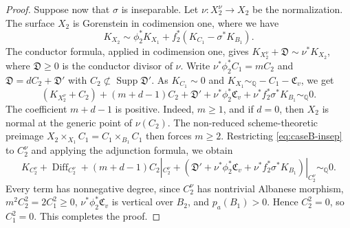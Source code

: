 \documentclass[10pt,abstract=true]{scrartcl}
\numberwithin{equation}{section}
\theoremstyle{definition}
\theoremstyle{remark}
\def\simQ{\sim_{\mathbb Q}} \def\geQ{\ge_{\mathbb Q}}
\DeclareMathOperator\Supp{Supp}
\begin{document}
\begin{proof}
  Suppose now that $\sigma$ is inseparable.
  Let $\nu\colon X_2^\nu\to X_2$ be the normalization.
  The surface $X_2$ is Gorenstein in codimension one, where we have
  \[
    K_{X_2}\sim\phi_2^*K_{X_1}+f_2^*(K_{C_1}-\sigma^*K_{B_1}).
  \]
  The conductor formula, applied in codimension one, gives $K_{X_2^\nu}+\mathfrak D\sim\nu^*K_{X_2}$, where $\mathfrak D\geq0$ is the conductor divisor of $\nu$.
  Write $\nu^*\phi_2^*C_1=mC_2$ and $\mathfrak D=dC_2+\mathfrak D'$ with $C_2\not\subset\Supp\mathfrak D'$.
  As $K_{C_1}\sim0$ and $K_{X_1}\simQ-C_1-\mathfrak C_v$, we get
  \begin{equation}\label{eq:caseB-insep}
    (K_{X_2^\nu}+C_2)+(m+d-1)C_2+\mathfrak D'+\nu^*\phi_2^*\mathfrak C_v+\nu^*f_2^*\sigma^*K_{B_1}\simQ0.
  \end{equation}
  The coefficient $m+d-1$ is positive.
  Indeed, $m\ge1$, and if $d=0$, then $X_2$ is normal at the generic point of $\nu(C_2)$.
  The non-reduced scheme-theoretic preimage $X_2\times_{X_1}C_1=C_1\times_{B_1}C_1$ then forces $m\ge2$.
  Restricting \eqref{eq:caseB-insep} to $C_2^\nu$ and applying the adjunction formula, we obtain
  \[
    K_{C_2^\nu}+\operatorname{Diff}_{C_2^\nu}+(m+d-1)C_2|_{C_2^\nu}+(\mathfrak D'+\nu^*\phi_2^*\mathfrak C_v+\nu^*f_2^*\sigma^*K_{B_1})|_{C_2^\nu}\simQ0.
  \]
  Every term has nonnegative degree, since $C_2^\nu$ has nontrivial Albanese morphism, $m^2C_2^2=2C_1^2\geq0$, $\nu^*\phi_2^*\mathfrak C_v$ is vertical over $B_2$, and $p_a(B_1)>0$.
  Hence $C_2^2=0$, so $C_1^2=0$.
  This completes the proof.
\end{proof}
\end{document}
